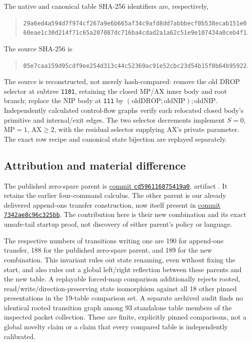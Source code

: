 \documentclass[11pt]{article}
\newcommand{\file}[1]{{\small\path{#1}}}
\begin{document}
The native and canonical table SHA-256 identifiers are, respectively,
\begin{quote}\small\ttfamily
\nolinkurl{29a6ed4a594d7f974cf267a9e6b665af34c9afd8dd7abbbecf0b538ecab151e0}\\
\nolinkurl{60eae1c30d214f71c65a207087dc716ba4cdad2a1a62c51e9e107434a0ceb4f1}.
\end{quote}
The source SHA-256 is
\begin{quote}\small\ttfamily
\nolinkurl{05e7caa159d95cdf9ee254d313c44c52369ac91e52cbc23d54b15f0b64b95922}.
\end{quote}

The source is reconstructed, not merely hash-compared: remove the old DROP selector at subtree \texttt{1101}, retaining the closed MP/AX inner body and root branch; replace the NIP body at \texttt{111} by $(\mathrm{oldDROP};\mathrm{oldNIP});\mathrm{oldNIP}$. Independently calculated control-flow graphs verify each relocated closed body's primitive and internal/exit edges. The two selector decrements implement $S=0$, MP$=1$, AX$\ge2$, with the residual selector supplying AX's private parameter. The exact row recipe and canonical state bijection are replayed separately.

\subsection*{Attribution and material difference}
The published zero-spare parent is \href{https://github.com/VladimirReshetnikov/ProveIt/commit/cd596116875419a0cc1b0665cc1c58c7b9f5a135}{commit \texttt{cd596116875419a0}}, artifact \file{Z215_Zero_Spare_2026-10-21.zip}. It retains the earlier four-command calculus. The other parent is our already delivered append-one transfer construction, now itself present in \href{https://github.com/VladimirReshetnikov/ProveIt/commit/7342ae8c96c325bb8340291f43d7573866a77cd7}{commit \texttt{7342ae8c96c325bb}}. The contribution here is their new combination and its exact unsafe-tail startup proof, not discovery of either parent's policy or language.

The respective numbers of transitions writing one are 190 for append-one transfer, 188 for the published zero-spare parent, and 189 for the new combination. This invariant rules out state renaming, even without fixing the start, and also rules out a global left/right reflection between these parents and the new table. A replayable forced-map comparison additionally rejects rooted, read/write/direction-preserving state isomorphism against all 18 other pinned presentations in the 19-table comparison set. A separate archived audit finds no identical rooted transition graph among 93 standalone table members of the inspected packet collection. These are finite, explicitly pinned comparisons, not a global novelty claim or a claim that every compared table is independently calibrated.
\end{document}
